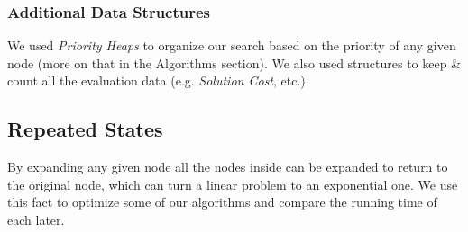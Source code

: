 \documentclass[12pt]{diazessay}
\begin{document}
        \subsubsection{Additional Data Structures}
            We used \textit{Priority Heaps} to organize our search based on the priority of any given node (more on that in the Algorithms section). We also used structures to keep \& count all the evaluation data (e.g. \textit{Solution Cost}, etc.).
    
    \subsection{Repeated States}
        By expanding any given node all the nodes inside can be expanded to return to the original node, which can turn a linear problem to an exponential one. We use this fact to optimize some of our algorithms and compare the running time of each later.
\end{document}

